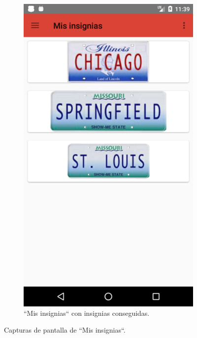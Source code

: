 \documentclass[twoside]{report}
\begin{document}
\begin{figure}[H]
\begin{center}
\begin{subfigure}[t]{.3\linewidth}
		\includegraphics[scale=0.2]{images/userguide/8.png}
		\caption{“Mis insignias“ con insignias conseguidas.}
	\end{subfigure}
\caption{Capturas de pantalla de “Mis insignias“.}
\end{center}
\end{figure}
\end{document}
